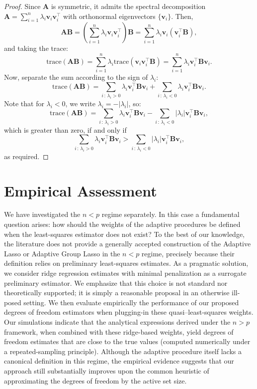 \documentclass[a4paper, 12pt]{article}
\newcommand{\trace}{\mathrm{trace}}
\newcommand{\T}{\top}
\def\bv{\boldsymbol{v}}
\def\bA{\mathbf{A}}
\def\bB{\mathbf{B}}
\def\bv{\mathbf{v}}
\begin{document}
\begin{proof}
Since $\bA$ is symmetric, it admits the spectral decomposition $\bA = \sum_{i=1}^n \lambda_i \bv_i \bv_i^{{\T}}$ with orthonormal eigenvectors $\{\bv_i\}$. Then,
\[
\bA\bB = \left( \sum_{i=1}^n \lambda_i \bv_i \bv_i^{{\T}} \right) \bB = \sum_{i=1}^n \lambda_i \bv_i (\bv_i^{\T} \bB),
\]
and taking the trace:
\[
\trace(\bA\bB) = \sum_{i=1}^n \lambda_i \trace(\bv_i \bv_i^{{\T}} \bB) = \sum_{i=1}^n \lambda_i \bv_i^{{\T}} \bB \bv_i.
\]
Now, separate the sum according to the sign of $\lambda_i$:
\[
\trace(\bA\bB) = \sum_{i\,:\,\lambda_i > 0} \lambda_i \bv_i^{{\T}} \bB \bv_i + \sum_{i\,:\,\lambda_i < 0} \lambda_i \bv_i^{{\T}} \bB \bv_i.
\]
Note that for $\lambda_i < 0$, we write $\lambda_i = -|\lambda_i|$, so:
\[
\trace(\bA\bB) = \sum_{i\,:\,\lambda_i > 0} \lambda_i \bv_i^{{\T}} \bB \bv_i - \sum_{i\,:\,\lambda_i < 0} |\lambda_i| \bv_i^{{\T}} \bB \bv_i,
\]
which is greater than zero, if and only if
\[
\sum_{i\,:\,\lambda_i > 0} \lambda_i \bv_i^{{\T}} \bB \bv_i > \sum_{i\,:\,\lambda_i < 0} |\lambda_i| \bv_i^{{\T}} \bB \bv_i,
\]
as required.
\end{proof}

\section{Empirical Assessment}
\label{sec:appendix_empirical_p>n}

We have investigated the $n<p$ regime separately. In this case a fundamental question arises: how should the weights of the adaptive procedures be defined when the least-squares estimator does not exist? To the best of our knowledge, the literature does not provide a generally accepted construction of the Adaptive Lasso or Adaptive Group Lasso in the $n<p$ regime, precisely because their definition relies on preliminary least-squares estimates.
%
As a pragmatic solution, we consider ridge regression estimates with minimal penalization as a surrogate preliminary estimator. We emphasize that this choice is not standard nor theoretically supported; it is simply a reasonable proposal in an otherwise ill-posed setting. We then evaluate empirically the performance of our proposed degrees of freedom estimators when plugging-in these quasi–least-squares weights.
%
Our simulations indicate that the analytical expressions derived under the $n>p$ framework, when combined with these ridge-based weights, yield degrees of freedom estimates that are close to the true values (computed numerically under a repeated-sampling principle). Although the adaptive procedure itself lacks a canonical definition in this regime, the empirical evidence suggests that our approach still substantially improves upon the common heuristic of approximating the degrees of freedom by the active set size.
\end{document}
